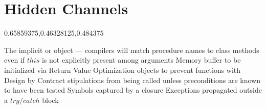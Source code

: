 
\section{Hidden Channels}\fbeg{}\begin{frame}{}

\vspace{2pt}	

{\hspace*{21pt}\begin{minipage}[c]{.9\textwidth}\begin{center}
{}
\end{center}\end{minipage}}
	
\vspace*{5pt}	

{\Large{}\selectfont

\hspace*{20pt}\begin{minipage}{.98\textwidth}
\vspace{4pt}
		
\begin{lightquadblockc}{0.65859375,0.46328125,0.484375}{\parbox{21cm}{\centering \vspace{3pt}}}
\begin{center}\begin{minipage}{\textwidth}
{\fontsize{20}{23}\selectfont \setlength{\leftmargini}{30pt}\begin{enumerate}
\dmitem {\dsp} The implicit  or  object
--- compilers will match procedure names to class methods 
even if $this$ is not explicitly present among arguments 
\vspace{20pt}
\dmitem {\dsp} Memory buffer to be initialized via Return Value Optimization
\vspace{20pt}
\dmitem {\dsp}  objects to prevent functions with Design by Contract 
stipulations from being called unless preconditions are known to have been tested
\vspace{20pt}
\dmitem {\dsp} Symbols captured by a closure
\vspace{20pt}
\dmitem {\dsp} Exceptions propagated outside a $try/catch$ block

\end{enumerate}
}\end{minipage}
\end{center}
\end{lightquadblockc}
\end{minipage}

}

\end{frame}

